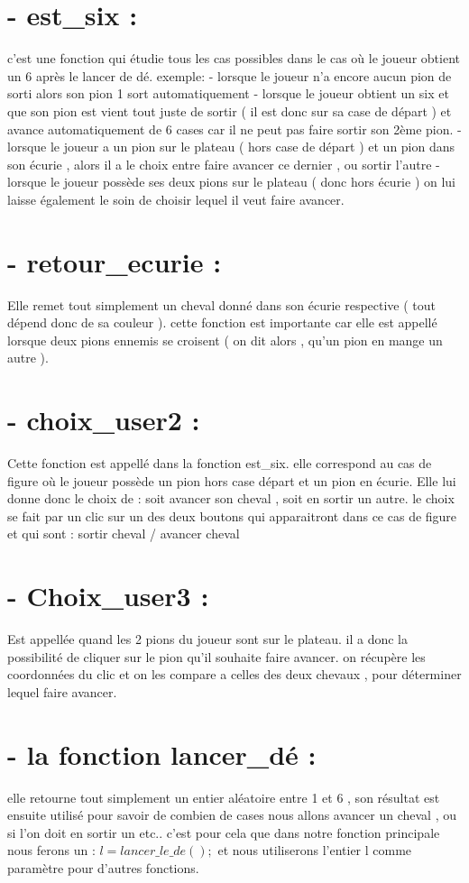 \documentclass[12pt, openany]{report}
\begin{document}
\section*{ - est\_six :} 
\large{c'est une fonction qui étudie tous les cas possibles dans le cas où le joueur obtient un 6 après le lancer de dé. 
exemple: 
- lorsque  le joueur n'a encore aucun pion de sorti alors son pion 1 sort automatiquement 
- lorsque le joueur obtient un six et que son pion est vient tout juste de sortir ( il est donc sur sa case de départ ) et avance automatiquement de 6 cases car il ne peut pas faire sortir son 2ème pion. 
- lorsque le joueur a un pion sur le plateau ( hors case de départ ) et un pion dans son écurie , alors il a le choix entre faire avancer ce dernier , ou sortir l'autre 
- lorsque le joueur possède ses deux pions sur le plateau ( donc hors écurie ) on lui laisse également le soin de choisir lequel il veut faire avancer.}
\newpage

\section*{ - retour\_ecurie : }
\large{Elle remet tout simplement un cheval donné dans son écurie respective ( tout dépend donc de sa couleur ).
cette fonction est importante car elle est appellé lorsque deux pions ennemis se croisent ( on dit alors , qu'un pion en mange un autre  ).}

\section*{ - choix\_user2 : }
\large{Cette fonction est appellé dans la fonction est\_six. 
elle correspond au cas de figure où le joueur possède un pion hors case départ et un pion en écurie. 
Elle lui donne donc le choix de : soit avancer son cheval 
, soit en sortir un autre.
le choix se fait par un clic sur un des deux boutons qui apparaitront dans ce cas de figure et qui sont : 
sortir cheval / avancer cheval}

\section*{ - Choix\_user3 : }
\large{Est appellée quand les 2 pions du joueur  sont sur le plateau. 
il a donc la possibilité de cliquer sur le pion qu'il souhaite faire avancer. 
on récupère les coordonnées du clic et on les compare a celles des deux chevaux , pour déterminer lequel faire avancer.}

\section*{ - la fonction lancer\_dé :}
\large{elle retourne tout simplement un entier aléatoire entre 1 et 6 , son résultat est ensuite utilisé pour savoir de combien de cases nous allons avancer un cheval , ou si l'on doit en sortir un etc.. 
c'est pour cela que dans notre fonction principale nous ferons un : 
$l=lancer\_le\_de();$
et nous utiliserons l'entier l comme paramètre pour d'autres fonctions.}
\end{document}
